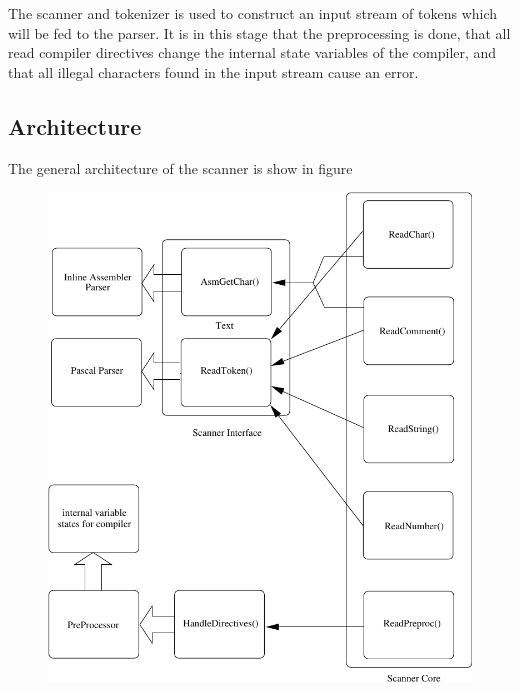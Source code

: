 \documentclass [a4paper,12pt]{article}
\begin{document}
The scanner and tokenizer is used to construct an input stream of tokens
which will be fed to the parser. It is in this stage that the preprocessing
is done, that all read compiler directives change the internal state
variables of the compiler, and that all illegal characters found in the
input stream cause an error.

\subsection{Architecture}
\label{subsec:architectureand}

The general architecture of the scanner is show in figure 

\begin{figure}
\ifpdf
\includegraphics{arch2.pdf}
\else

\end{figure}
\end{document}
